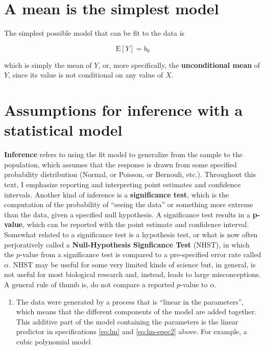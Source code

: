 \documentclass[]{book}
\providecommand{\tightlist}{%
  \setlength{\itemsep}{0pt}\setlength{\parskip}{0pt}}
\begin{document}
\section{A mean is the simplest
model}\label{a-mean-is-the-simplest-model}

The simplest possible model that can be fit to the data is

\begin{equation}
\mathrm{E}[Y] = b_0
\label{eq:unconditional}
\end{equation}

which is simply the mean of \(Y\), or, more specifically, the
\textbf{unconditional mean} of \(Y\), since its value is not conditional
on any value of \(X\).

\section{Assumptions for inference with a statistical
model}\label{assumptions-for-inference-with-a-statistical-model}

\textbf{Inference} refers to using the fit model to generalize from the
sample to the population, which assumes that the response is drawn from
some specified probability distribution (Normal, or Poisson, or
Bernouli, etc.). Throughout this text, I emphasize reporting and
interpreting point estimates and confidence intervals. Another kind of
inference is a \textbf{significance test}, which is the computation of
the probability of ``seeing the data'' or something more extreme than
the data, given a specified null hypothesis. A significance test results
in a \textbf{p-value}, which can be reported with the point estimate and
confidence interval. Somewhat related to a significance test is a
hypothesis test, or what is now often perjoratively called a
\textbf{Null-Hypothesis Signficance Test} (NHST), in which the
\(p\)-value from a significance test is compared to a pre-specified
error rate called \(\alpha\). NHST may be useful for some very limited
kinds of science but, in general, is not useful for most biological
research and, instead, leads to large misconceptions. A general rule of
thumb is, do not compare a reported \(p\)-value to \(\alpha\).

\begin{enumerate}
\def\labelenumi{\arabic{enumi}.}
\tightlist
\item
  The data were generated by a process that is ``linear in the
  parameters'', which means that the different components of the model
  are added together. This additive part of the model containing the
  parameters is the linear predictor in specifications \eqref{eq:lm} and
  \eqref{eq:lm-spec2} above. For example, a cubic polynomial model
\end{enumerate}
\end{document}
